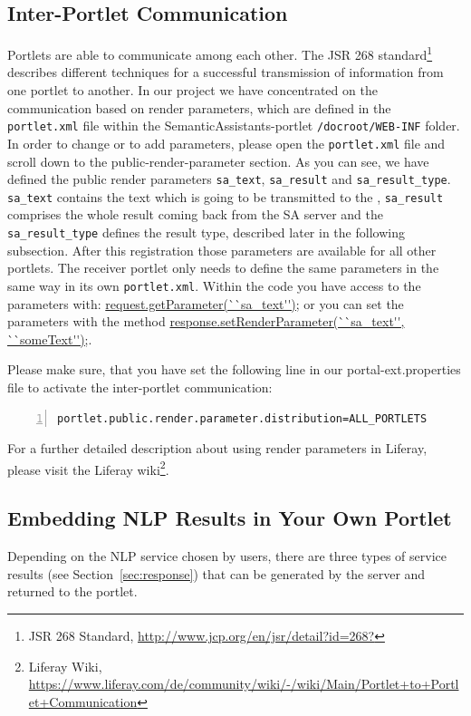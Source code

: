 \subsection{Inter-Portlet Communication}
Portlets are able to communicate among each other. The JSR 268 standard\footnote{JSR 268 Standard, \url{http://www.jcp.org/en/jsr/detail?id=268?}} describes different techniques for a successful transmission of information from one portlet to another. In our project we have concentrated on the communication based on render parameters, which are defined in the \texttt{portlet.xml} file within the SemanticAssistants-portlet \texttt{/docroot/WEB-INF} folder. In order to change or to add parameters, please open the \texttt{portlet.xml} file and scroll down to the public-render-parameter section. As you can see, we have defined the public render parameters \texttt{sa\_text}, \texttt{sa\_result} and \texttt{sa\_result\_type}. \texttt{sa\_text} contains the text which is going to be transmitted to the \sa, \texttt{sa\_result} comprises the whole result coming back from the SA server and the \texttt{sa\_result\_type} defines the result type, described later in the following subsection. After this registration those parameters are available for all other portlets. The receiver portlet only needs to define the same parameters in the same way in its own \texttt{portlet.xml}. Within the code you have access to the parameters with: \url{request.getParameter(``sa\_text'');} or you can set the parameters with the method \url{response.setRenderParameter(``sa\_text'', ``someText'');}.

Please make sure, that you have set the following line in our portal-ext.properties file to activate the inter-portlet communication:

\begin{lstlisting}[language=XML,numbers=left,xleftmargin=4mm,columns=flexible]
portlet.public.render.parameter.distribution=ALL_PORTLETS
\end{lstlisting}

For a further detailed description about using render parameters in Liferay, please visit the Liferay wiki\footnote{Liferay Wiki, \url{https://www.liferay.com/de/community/wiki/-/wiki/Main/Portlet+to+Portlet+Communication}}. 

\subsection{Embedding NLP Results in Your Own Portlet}
Depending on the NLP service chosen by users, there are three types of service results  (see Section~\ref{sec:response}) that can be generated by the \sa server and returned to the portlet.

